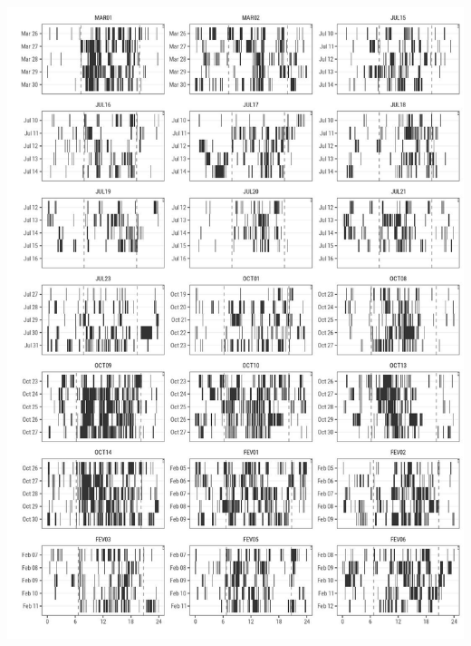 \documentclass[msc,numbers,hidelinks]{coppe}
\begin{document}
  \begin{center}\includegraphics[width=1\linewidth]{../04_figures/actograms/actograms_high} \end{center}
\end{document}
